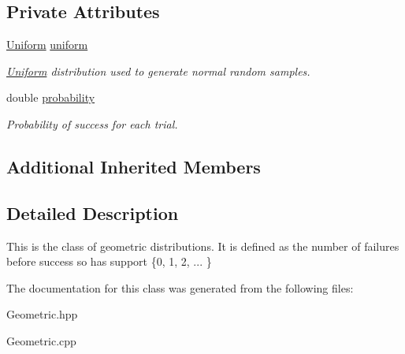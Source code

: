 \subsection*{Private Attributes}
\begin{DoxyCompactItemize}
\item 
\mbox{\label{class_geometric_a8cf85792786df62248c0245bab9c6d28}} 
\hyperlink{class_uniform}{Uniform} \hyperlink{class_geometric_a8cf85792786df62248c0245bab9c6d28}{uniform}
\begin{DoxyCompactList}\small\item\em \hyperlink{class_uniform}{Uniform} distribution used to generate normal random samples. \end{DoxyCompactList}\item 
\mbox{\label{class_geometric_abb5f3ad35a83e34e4ea139af69f13fe8}} 
double \hyperlink{class_geometric_abb5f3ad35a83e34e4ea139af69f13fe8}{probability}
\begin{DoxyCompactList}\small\item\em Probability of success for each trial. \end{DoxyCompactList}\end{DoxyCompactItemize}
\subsection*{Additional Inherited Members}


\subsection{Detailed Description}
This is the class of geometric distributions. It is defined as the number of failures before success so has support \{0, 1, 2, ... \} 

The documentation for this class was generated from the following files\+:\begin{DoxyCompactItemize}
\item 
Geometric.\+hpp\item 
Geometric.\+cpp\end{DoxyCompactItemize}
